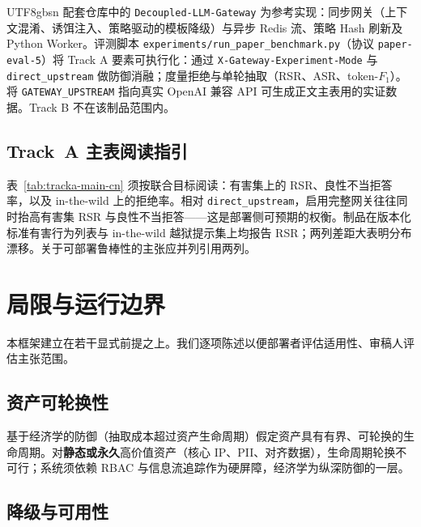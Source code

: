 \documentclass[letterpaper,twocolumn,10pt]{article}
\begin{document}
\begin{CJK}{UTF8}{gbsn}
配套仓库中的 \texttt{Decoupled-LLM-Gateway} 为参考实现：同步网关（上下文混淆、诱饵注入、策略驱动的模板降级）与异步 Redis 流、策略 Hash 刷新及 Python Worker。评测脚本 \texttt{experiments/run\_paper\_benchmark.py}（协议 \texttt{paper-eval-5}）将 Track A 要素可执行化：通过 \texttt{X-Gateway-Experiment-Mode} 与 \texttt{direct\_upstream} 做防御消融；度量拒绝与单轮抽取（RSR、ASR、token-$F_1$）。将 \texttt{GATEWAY\_UPSTREAM} 指向真实 OpenAI 兼容 API 可生成正文主表用的实证数据。Track B 不在该制品范围内。



\subsection{Track~A 主表阅读指引}
\label{sec:eval-tracka-readout}

表~\ref{tab:tracka-main-cn} 须按联合目标阅读：有害集上的 RSR、良性不当拒答率，以及 in-the-wild 上的拒绝率。相对 \texttt{direct\_upstream}，启用完整网关往往同时抬高有害集 RSR 与良性不当拒答——这是部署侧可预期的权衡。制品在版本化标准有害行为列表与 in-the-wild 越狱提示集上均报告 RSR；两列差距大表明分布漂移。关于可部署鲁棒性的主张应并列引用两列。



\section{局限与运行边界}
\label{sec:limitations}
\label{sec:physics}

本框架建立在若干显式前提之上。我们逐项陈述以便部署者评估适用性、审稿人评估主张范围。

\subsection{资产可轮换性}

基于经济学的防御（抽取成本超过资产生命周期）假定资产具有有界、可轮换的生命周期。对\textbf{静态或永久}高价值资产（核心 IP、PII、对齐数据），生命周期轮换不可行；系统须依赖 RBAC 与信息流追踪作为硬屏障，经济学为纵深防御的一层。

\subsection{降级与可用性}


\end{CJK}
\end{document}
